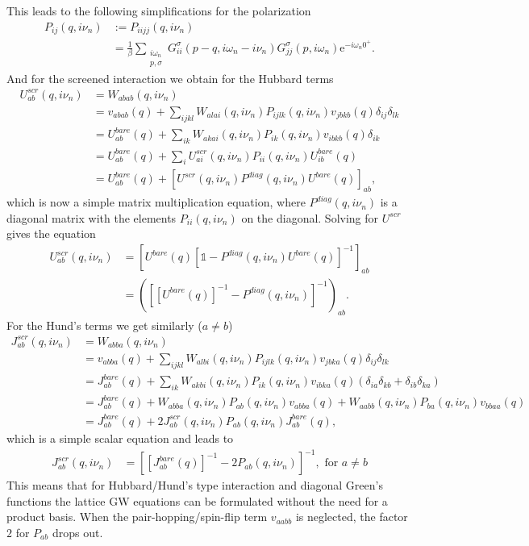 \documentclass[12pt,a4paper]{scrartcl}
\numberwithin{equation}{section}
\newcommand{\unity}{\mathds{1}}
\begin{document}
This leads to the following simplifications
for the polarization
\begin{align}
P_{ij}(q,i\nu_n) &:= P_{iijj}(q,i\nu_n) \\
&=  \frac{1}{\beta}\sum_{\substack{i\omega_n\\ p, \sigma}}  
     G^{\sigma}_{ii}(p-q,i\omega_n-i\nu_n) G^{\sigma}_{jj}(p,i\omega_n) \mathrm{e}^{-i\omega_n 0^+} .
\end{align}
And for the screened interaction we obtain
for the Hubbard terms
\begin{align}
 U^{scr}_{ab}(q,i\nu_n) &= W_{abab}(q,i\nu_n) \\
&= v_{abab}(q) + \sum_{ijkl} W_{alai}(q,i\nu_n) P_{ijlk}(q,i\nu_n) v_{jbkb}(q) \delta_{ij}\delta_{lk} \\
&= U^{bare}_{ab}(q) + \sum_{ik} W_{akai}(q,i\nu_n) P_{ik}(q,i\nu_n) v_{ibkb}(q) \delta_{ik}  \\
&= U^{bare}_{ab}(q) + \sum_{i} U^{scr}_{ai}(q,i\nu_n) P_{ii}(q,i\nu_n) U^{bare}_{ib}(q) \\
&= U^{bare}_{ab}(q) + \left[ U^{scr}(q,i\nu_n) P^{diag}(q,i\nu_n) U^{bare}(q) \right]_{ab}, 
\end{align}
which is now a simple matrix multiplication equation, where 
$P^{diag}(q,i\nu_n)$ is a diagonal matrix with the elements $P_{ii}(q,i\nu_n)$ on the diagonal.
Solving for $U^{scr}$ gives the equation
\begin{align}
 U^{scr}_{ab}(q,i\nu_n) 
 &= \left[ U^{bare}(q) \left[ \unity - P^{diag}(q,i\nu_n) U^{bare}(q) \right]^{-1} \right]_{ab}\\
 &= \left( \left[ [U^{bare}(q)]^{-1} - P^{diag}(q,i\nu_n)  \right]^{-1} \right)_{ab}.
\label{eq:u_scr_gw_lattice}
 \end{align}
For the Hund's terms we get similarly ($a\neq b$)
\begin{align}
 J^{scr}_{ab}(q,i\nu_n) &= W_{abba}(q,i\nu_n) \\
&= v_{abba}(q) + \sum_{ijkl} W_{albi}(q,i\nu_n) P_{ijlk}(q,i\nu_n) v_{jbka}(q) \delta_{ij}\delta_{lk} \\
&= J^{bare}_{ab}(q) + \sum_{ik} W_{akbi}(q,i\nu_n) P_{ik}(q,i\nu_n) v_{ibka}(q) (\delta_{ia}\delta_{kb}+\delta_{ib}\delta_{ka})  \\
&= J^{bare}_{ab}(q) + W_{abba}(q,i\nu_n) P_{ab}(q,i\nu_n) v_{abba}(q)
                    + W_{aabb}(q,i\nu_n) P_{ba}(q,i\nu_n) v_{bbaa}(q)\\
&= J^{bare}_{ab}(q) + 2 J_{ab}^{scr}(q,i\nu_n) P_{ab}(q,i\nu_n) J_{ab}^{bare}(q), 
\end{align}
which is a simple scalar equation and leads to
\begin{align}
 J^{scr}_{ab}(q,i\nu_n) 
&= \left[ [J^{bare}_{ab}(q)]^{-1} - 2 P_{ab}(q,i\nu_n) \right]^{-1}, \mbox{ \ for }a\neq b
\end{align}
This means that for Hubbard/Hund's type interaction and diagonal Green's functions
the lattice GW equations can be formulated without the need for a product basis.
When the pair-hopping/spin-flip term $v_{aabb}$ is neglected, the factor $2$ 
for $P_{ab}$ drops out.
\end{document}
